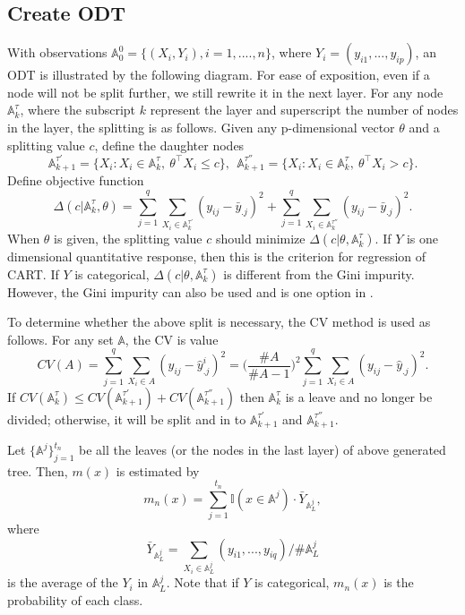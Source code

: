 \documentclass[nojss]{jss}
\numberwithin{equation}{section}
\begin{document}
\subsection{Create ODT}
With observations $ \mathbb{A}^0_0 = \{(X_i, Y_i), i = 1, ...., n \}$, where $ Y_i = (y_{i1}, ..., y_{ip}) $,
an ODT is illustrated by the following diagram. For ease of exposition, even if a node will not be split further, we still rewrite it in the next layer.   For any node
$\mathbb{A}_k^\tau $, where the subscript $ k $ represent the layer and superscript the number of nodes in the layer, the splitting is as follows. Given any p-dimensional vector  $\theta$ and a splitting value $ c $, define the daughter nodes
  $$
    \mathbb{A}_{k+1}^{\tau'} = \{ X_i: X_i \in \mathbb{A}_k^\tau, \ \theta^\top X_i \le c\}, \ \
    \mathbb{A}_{k+1}^{\tau''} = \{ X_i: X_i \in \mathbb{A}_k^\tau, \ \theta^\top X_i > c\}.
  $$
Define objective function
$$
  \Delta(c| \mathbb{A}_k^\tau, \theta)=  \sum_{j=1}^q \sum_{X_i \in \mathbb{A}_k^{\tau'}} (y_{ij} - \bar y_{.j})^2  + \sum_{j=1}^q \sum_{X_i \in \mathbb{A}_k^{\tau''}} (y_{ij} - \bar y_{.j})^2.
$$
When $ \theta $ is given, the splitting value $ c$ should minimize $ \Delta(c|\theta,  \mathbb{A}_k^\tau)$. If $Y$ is one dimensional quantitative response, then this is the criterion for regression of CART. If $Y$ is categorical, $ \Delta(c|\theta, \mathbb{A}_k^\tau) $ is different from the Gini impurity. However, the Gini impurity can also be used and is one option in .

To determine whether the above split is necessary, the CV method is used as follows. For any set $ \mathbb{A} $, the CV is value
$$
  CV(A) = \sum_{j=1}^q\sum_{X_i \in A} ( y_{ij} - \hat y^i_{.j})^2 = \Big(\frac{\#A}{\#A -1}\Big)^2 \sum_{j=1}^q\sum_{X_i \in A} ( y_{ij} - \hat y_{.j})^2.
$$
If $ CV(\mathbb{A}_k^\tau ) \le CV(\mathbb{A}_{k+1}^{\tau'}) + CV(\mathbb{A}_{k+1}^{\tau''}) $ then $ \mathbb{A}_k^\tau $ is a leave and no longer be divided; otherwise, it will be split and in to $ \mathbb{A}_{k+1}^{\tau'} $ and $ \mathbb{A}_{k+1}^{\tau''} $.

Let $\{\mathbb{A}^j\}_{j=1}^{t_n}$ be all the leaves (or the nodes in the last layer) of above generated tree. Then, $m(x)$ is estimated by
$$m_{n}(x)=\sum_{j=1}^{t_n}{\mathbb{I}(x\in \mathbb{A}^j)\cdot \bar{Y}_{\mathbb{A}_L^j}},$$
where
$$ \bar{Y}_{\mathbb{A}_L^j} = \sum_{X_i\in \mathbb{A}_L^j} (y_{i1}, ...,  y_{iq})/\# \mathbb{A}_L^j $$
is the average of the $ Y_i $ in $ \mathbb{A}_L^j$. Note that if $ Y$ is categorical,  $ m_{n}(x) $ is the probability of each class.
\end{document}
